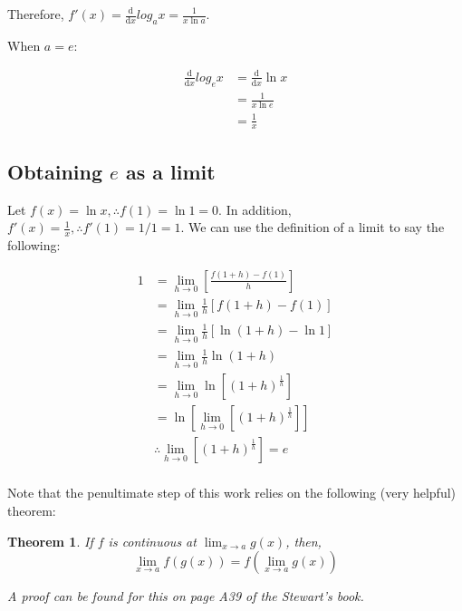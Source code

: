 \documentclass[12pt]{article}
\newtheorem*{theorem}{Theorem}
\begin{document}
Therefore, $f'(x) = \frac{\text{d}}{\text{d}x} log_a{x} = \frac{1}{x \ln a}$.

When $a = e$:

\begin{equation}
    \begin{split}
        \frac{\text{d}}{\text{d}x} log_e{x} &= \frac{\text{d}}{\text{d}x} \ln x\\
        &= \frac{1}{x \ln e} \\
        &= \frac{1}{x}
    \end{split}
\end{equation}

\subsection{Obtaining \texorpdfstring{$e$}{Euler's number} as a limit}

Let $f(x) = \ln x, \therefore f(1) = \ln 1 = 0$. In addition, $f'(x) = \frac{1}{x}, \therefore f'(1) = 1/1 = 1$. We can use the definition of a limit to say the following:

\begin{equation}\label{eqn:elimit}
    \begin{split}
        1 &= \lim_{h \to 0}[\frac{f(1+h) - f(1)}{h}]\\
        &= \lim_{h\to 0}\frac{1}{h}[f(1+h)-f(1)]\\
        &= \lim_{h\to 0} \frac{1}{h}[\ln (1+h) - \ln 1]\\
        &= \lim_{h\to 0} \frac{1}{h} \ln(1+h)\\
        &= \lim_{h\to 0} \ln[(1+h)^{\frac{1}{h}}]\\
        &= \ln[\lim_{h\to 0}[(1+h)^{\frac{1}{h}}]]\\
        &\therefore \lim_{h\to 0}[(1+h)^{\frac{1}{h}}] = e\\
    \end{split}
\end{equation}

Note that the penultimate step of this work relies on the following (very helpful) theorem:

\begin{theorem}
    If $f$ is continuous at $\lim_{x\to a} g(x)$, then,
    $$\lim_{x\to a} f(g(x)) = f(\lim_{x\to a} g(x))$$

    \textit{A proof can be found for this on page A39 of the Stewart's book.}
\end{theorem}
\end{document}
